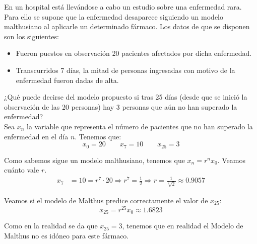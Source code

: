 \begin{ejercicio} En un hospital está llevándose a cabo un estudio sobre una enfermedad rara. Para ello se supone que la enfermedad desaparece siguiendo un modelo malthusiano al aplicarle un determinado fármaco. Los datos de que se disponen son los siguientes:
    \begin{itemize}
        \item Fueron puestos en observación 20 pacientes afectados por dicha enfermedad.
        \item Transcurridos 7 días, la mitad de personas ingresadas con motivo de la enfermedad fueron dadas de alta.
    \end{itemize}
    
    ¿Qué puede decirse del modelo propuesto si tras 25 días (desde que se inició la observación de las 20 personas) hay 3 personas que aún no han superado la enfermedad?\\

    Sea $x_n$ la variable que representa el número de pacientes que no han superado la enfermedad en el día $n$. Tenemos que:
    \begin{equation*}
        x_0 = 20 \qquad x_7 = 10 \qquad x_{25} = 3
    \end{equation*}

    Como sabemos sigue un modelo malthusiano, tenemos que $x_n = r^nx_0$. Veamos cuánto vale $r$.
    \begin{align*}
        x_7 &= 10 = r^7\cdot 20
        \Longrightarrow
        r^7 = \frac{1}{2} \Longrightarrow
        r = \frac{1}{\sqrt[7]{2}}\approx 0.9057
    \end{align*}

    Veamos si el modelo de Malthus predice correctamente el valor de $x_{25}$:
    \begin{equation*}
        x_{25} = r^{25}x_0 \approx 1.6823
    \end{equation*}

    Como en la realidad se da que $x_{25}=3$, tenemos que en realidad el Modelo de Malthus no es idóneo para este fármaco.
\end{ejercicio}


